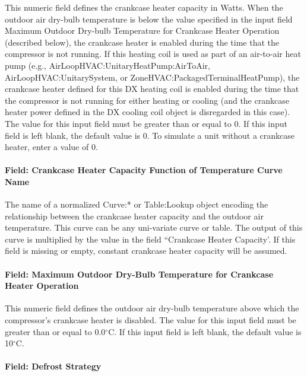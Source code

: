 This numeric field defines the crankcase heater capacity in Watts. When the outdoor air dry-bulb temperature is below the value specified in the input field Maximum Outdoor Dry-bulb Temperature for Crankcase Heater Operation (described below), the crankcase heater is enabled during the time that the compressor is not running. If this heating coil is used as part of an air-to-air heat pump (e.g., AirLoopHVAC:UnitaryHeatPump:AirToAir, AirLoopHVAC:UnitarySystem, or ZoneHVAC:PackagedTerminalHeatPump), the crankcase heater defined for this DX heating coil is enabled during the time that the compressor is not running for either heating or cooling (and the crankcase heater power defined in the DX cooling coil object is disregarded in this case). The value for this input field must be greater than or equal to 0. If this input field is left blank, the default value is 0. To simulate a unit without a crankcase heater, enter a value of 0.

\paragraph{Field: Crankcase Heater Capacity Function of Temperature Curve Name}

The name of a normalized Curve:* or Table:Lookup object encoding the relationship between the crankcase heater capacity and the outdoor air temperature. This curve can be any uni-variate curve or table. The output of this curve is multiplied by the value in the field ``Crankcase Heater Capacity'. If this field is missing or empty, constant crankcase heater capacity will be
assumed.

\paragraph{Field: Maximum Outdoor Dry-Bulb Temperature for Crankcase Heater Operation}\label{field-maximum-outdoor-dry-bulb-temperature-for-crankcase-heater-operation-4}

This numeric field defines the outdoor air dry-bulb temperature above which the compressor's crankcase heater is disabled. The value for this input field must be greater than or equal to 0.0$^\circ$C. If this input field is left blank, the default value is 10$^\circ$C.

\paragraph{Field: Defrost Strategy}\label{field-defrost-strategy}

